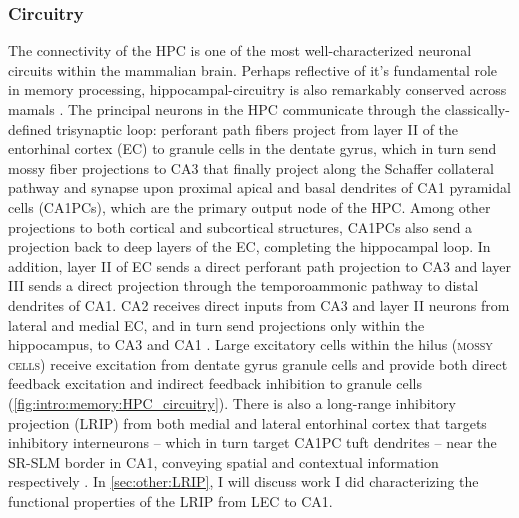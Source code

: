 \subsubsection{Circuitry}
The connectivity of the \ac{HPC} is one of the most well-characterized neuronal circuits within the mammalian brain.
Perhaps reflective of it's fundamental role in memory processing, hippocampal-circuitry is also remarkably conserved across mamals \citep{Manns2006}.
The principal neurons in the \ac{HPC} communicate through the classically-defined trisynaptic loop: perforant path fibers project from layer II of the entorhinal cortex (EC) to granule cells in the dentate gyrus, which in turn send mossy fiber projections to CA3 that finally project along the Schaffer collateral pathway and synapse upon proximal apical and basal dendrites of CA1 pyramidal cells (CA1PCs), which are the primary output node of the \ac{HPC}.
Among other projections to both cortical and subcortical structures, CA1PCs also send a projection back to deep layers of the EC, completing the hippocampal loop.
In addition, layer II of EC sends a direct perforant path projection to CA3 and layer III sends a direct projection through the temporoammonic pathway to distal dendrites of CA1.
CA2 receives direct inputs from CA3 and layer II neurons from lateral and medial \ac{EC}, and in turn send projections only within the hippocampus, to CA3 and CA1 \citep{Hitti2014}. 
Large excitatory cells within the hilus (\textsc{mossy cells}) receive excitation from dentate gyrus granule cells and provide both direct feedback excitation and indirect feedback inhibition to granule cells (\autoref{fig:intro:memory:HPC_circuitry}).
There is also a long-range inhibitory projection (LRIP) from both medial and lateral entorhinal cortex that targets inhibitory interneurons -- which in turn target CA1PC tuft dendrites -- near the SR-SLM border in CA1, conveying spatial and contextual information respectively \citep{Basu2016}.
In \autoref{sec:other:LRIP}, I will discuss work I did characterizing the functional properties of the LRIP from LEC to CA1. 

